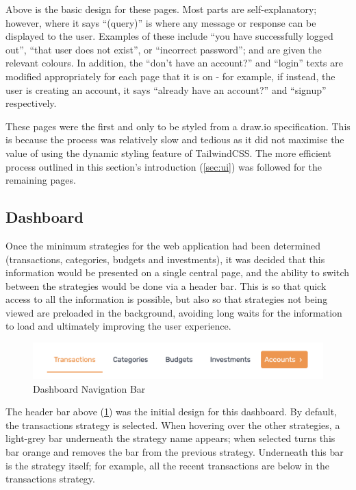 Above is the basic design for these pages. Most parts are self-explanatory; however, where it says ``(query)'' is where any message or response can be displayed to the user. Examples of these include ``you have successfully logged out'', ``that user does not exist'', or ``incorrect password''; and are given the relevant colours. In addition, the ``don't have an account?'' and ``login'' texts are modified appropriately for each page that it is on - for example, if instead, the user is creating an account, it says ``already have an account?'' and ``signup'' respectively.

These pages were the first and only to be styled from a draw.io specification. This is because the process was relatively slow and tedious as it did not maximise the value of using the dynamic styling feature of TailwindCSS. The more efficient process outlined in this section's introduction (\ref{sec:ui}) was followed for the remaining pages.

\subsection{Dashboard}
Once the minimum strategies for the web application had been determined (transactions, categories, budgets and investments), it was decided that this information would be presented on a single central page, and the ability to switch between the strategies would be done via a header bar. This is so that quick access to all the information is possible, but also so that strategies not being viewed are preloaded in the background, avoiding long waits for the information to load and ultimately improving the user experience.

\begin{figure}[H]
	\centering
	\includegraphics[width=\textwidth]{images/header_navigation_bar.png}
	\caption{Dashboard Navigation Bar}
	\label{fig:DashboardNavigationBar}
\end{figure}

The header bar above (\ref{fig:DashboardNavigationBar}) was the initial design for this dashboard. By default, the transactions strategy is selected. When hovering over the other strategies, a light-grey bar underneath the strategy name appears; when selected turns this bar orange and removes the bar from the previous strategy. Underneath this bar is the strategy itself; for example, all the recent transactions are below in the transactions strategy.

